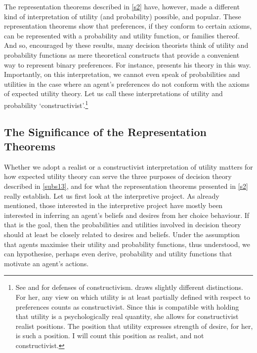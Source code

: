 The representation theorems described in \autoref{s2} have, however, made a different kind of interpretation of utility (and probability) possible, and popular. These representation theorems show that preferences, if they conform to certain axioms, can be represented with a probability and utility function, or families thereof. And so, encouraged by these results, many decision theorists think of utility and probability functions as mere theoretical constructs that provide a convenient way to represent binary preferences. For instance, \citet{Savage1954} presents his theory in this way.  Importantly, on this interpretation, we cannot even speak of probabilities and utilities in the case where an agent's preferences do not conform with the axioms of expected utility theory. Let us call these interpretations of utility and probability `constructivist'.\footnote{See \citet{Dreier1996} and \citet{Velleman1993} for defenses of constructivism. \citet{Buchak2013} draws slightly different distinctions. For her, any view on which utility is at least partially defined with respect to preferences counts as constructivist. Since this is compatible with holding that utility is a psychologically real quantity, she allows for constructivist realist positions. The position that utility expresses strength of desire, for her, is such a position. I will count this position as realist, and not constructivist.}

\subsection{The Significance of the Representation Theorems}\label{subs32}

Whether we adopt a realist or a constructivist interpretation of utility matters for how expected utility theory can serve the three purposes of decision theory described in \autoref{subs13}, and for what the representation theorems presented in \autoref{s2} really establish. Let us first look at the interpretive project. As already mentioned, those interested in the interpretive project have mostly been interested in inferring an agent's beliefs and desires from her choice behaviour. If that is the goal, then the probabilities and utilities involved in decision theory should at least be closely related to desires and beliefs. Under the assumption that agents maximise their utility and probability functions, thus understood, we can hypothesise, perhaps even derive, probability and utility functions that motivate an agent's actions.

